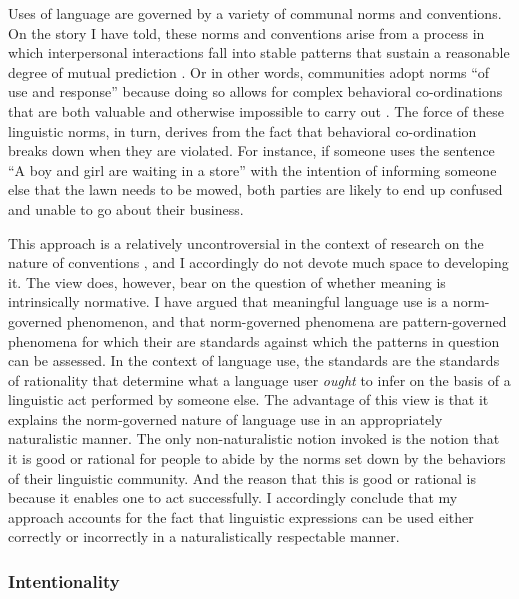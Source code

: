 Uses of language are governed by a variety of communal norms and conventions. On the story I have told, these norms and conventions arise from a process in which interpersonal interactions fall into stable patterns that sustain a reasonable degree of mutual prediction \citep{clark:2013}. Or in other words, communities adopt norms ``of use and response'' because doing so allows for complex behavioral co-ordinations that are both valuable and otherwise impossible to carry out \citep[][p. 50]{Millikan:2005}. The force of these linguistic norms, in turn, derives from the fact that behavioral co-ordination breaks down when they are violated. For instance, if someone uses the sentence ``A boy and girl are waiting in a store'' with the intention of informing someone else that the lawn needs to be mowed, both parties are likely to end up confused and unable to go about their business.

This approach is a relatively uncontroversial in the context of research on the nature of conventions \citep{Millikan:2005,Lewis:1975}, and I accordingly do not devote much space to developing it. The view does, however, bear on the question of whether meaning is intrinsically normative. I have argued that meaningful language use is a norm-governed phenomenon, and that norm-governed phenomena are pattern-governed phenomena for which their are standards against which the patterns in question can be assessed. In the context of language use, the standards are the standards of rationality that determine what a language user \textit{ought} to infer on the basis of a linguistic act performed by someone else. The advantage of this view is that it explains the norm-governed nature of language use in an appropriately naturalistic manner. The only non-naturalistic notion invoked is the notion that it is good or rational for people to abide by the norms set down by the behaviors of their linguistic community. And the reason that this is good or rational is because it enables one to act successfully. I accordingly conclude that my approach accounts for the fact that linguistic expressions can be used either correctly or incorrectly in a naturalistically respectable manner. 

\subsubsection{Intentionality}

